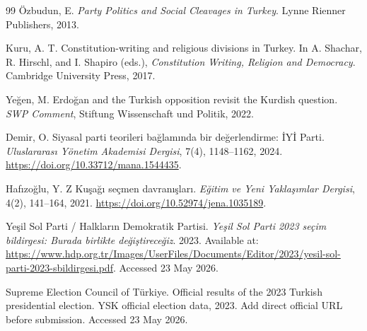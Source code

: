 \documentclass[pdflatex,sn-mathphys-num,iicol]{sn-jnl}
\begin{document}
\begin{thebibliography}{99}
Özbudun, E.
\textit{Party Politics and Social Cleavages in Turkey}.
Lynne Rienner Publishers, 2013.

Kuru, A. T.
Constitution-writing and religious divisions in Turkey.
In A. Shachar, R. Hirschl, and I. Shapiro (eds.), \textit{Constitution Writing, Religion and Democracy}.
Cambridge University Press, 2017.

Yeğen, M.
Erdoğan and the Turkish opposition revisit the Kurdish question.
\textit{SWP Comment}, Stiftung Wissenschaft und Politik, 2022.

Demir, O.
Siyasal parti teorileri bağlamında bir değerlendirme: İYİ Parti.
\textit{Uluslararası Yönetim Akademisi Dergisi}, 7(4), 1148--1162, 2024.
\url{https://doi.org/10.33712/mana.1544435}.

Hafızoğlu, Y.
Z Kuşağı seçmen davranışları.
\textit{Eğitim ve Yeni Yaklaşımlar Dergisi}, 4(2), 141--164, 2021.
\url{https://doi.org/10.52974/jena.1035189}.

Yeşil Sol Parti / Halkların Demokratik Partisi.
\textit{Yeşil Sol Parti 2023 seçim bildirgesi: Burada birlikte değiştireceğiz}.
2023. Available at: \url{https://www.hdp.org.tr/Images/UserFiles/Documents/Editor/2023/yesil-sol-parti-2023-sbildirgesi.pdf}. Accessed 23 May 2026.

Supreme Election Council of Türkiye.
Official results of the 2023 Turkish presidential election.
YSK official election data, 2023. Add direct official URL before submission. Accessed 23 May 2026.

\end{thebibliography}
\end{document}
